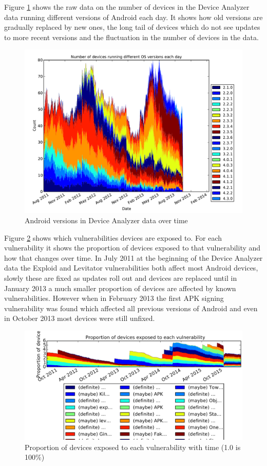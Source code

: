 \documentclass[conference,a4paper,twoside]{IEEEtran}
\begin{document}
Figure \ref{fig:os} shows the raw data on the number of devices in the Device Analyzer data running different versions of Android each day.
It shows how old versions are gradually replaced by new ones, the long tail of devices which do not see updates to more recent versions and the fluctuation in the number of devices in the data.
\begin{figure}%
\centering
\includegraphics[width=\columnwidth]{figures/os}
\caption{Android versions in Device Analyzer data over time}
\label{fig:os}
\end{figure}

Figure \ref{fig:vulnerabilities} shows which vulnerabilities devices are exposed to.
For each vulnerability it shows the proportion of devices exposed to that vulnerability and how that changes over time.
In July 2011 at the beginning of the Device Analyzer data the Exploid and Levitator vulnerabilities both affect most Android devices, slowly these are fixed as updates roll out and devices are replaced until in January 2013 a much smaller proportion of devices are affected by known vulnerabilities.
However when in February 2013 the first APK signing vulnerability was found which affected all previous versions of Android and even in October 2013 most devices were still unfixed. %
\begin{figure}%
\centering
\includegraphics[width=\columnwidth]{figures/vulnerabilities}
\caption{Proportion of devices exposed to each vulnerability with time (1.0 is 100\%)}
\label{fig:vulnerabilities}
\end{figure}
\end{document}
